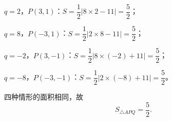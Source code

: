 \begin{answer}
$q=2$，$P(3,1)$：$S=\dfrac12|8\times2-11|=\dfrac52$；

$q=8$，$P(-3,1)$：$S=\dfrac12|2\times8-11|=\dfrac52$；

$q=-2$，$P(3,-1)$：$S=\dfrac12|8\times(-2)+11|=\dfrac52$；

$q=-8$，$P(-3,-1)$：$S=\dfrac12|2\times(-8)+11|=\dfrac52$。

四种情形的面积相同，故
\nopagebreak[4]
\[S_{\triangle APQ}=\frac52 .\]



\end{answer}
